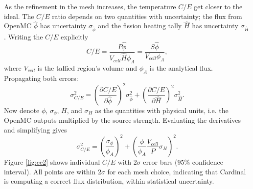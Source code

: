 \documentclass[letterpaper]{mc2023}
\begin{document}
As the refinement in the mesh increases, the temperature $C/E$ get closer to the ideal. The $C/E$ ratio depends on two quantities with uncertainty; the
flux from OpenMC $\hat{\phi}$ has uncertainty $\sigma_{\hat{\phi}}$ and the fission heating tally $\hat{H}$ has uncertainty $\sigma_{\hat{H}}$. Writing
the $C/E$ explicitly
\begin{equation}\label{eq:CE_formula}
    C/E =
    \frac{P\hat{\phi}}{V_{cell}\hat{H}\phi_{A}} = \frac{S\hat{\phi}}{V_{cell}\phi_{A}},
\end{equation}
where $V_{cell}$ is the tallied region's volume and $\phi_{A}$ is the analytical flux. Propagating both errors:
\begin{equation}\label{eq:sigma_ce_def}
    \sigma_{C/E}^2 =
    \left( \frac{\partial C/E}{\partial\hat{\phi}} \right)^2 \sigma_{\hat{\phi}}^2  +
     \left( \frac{\partial C/E}{\partial \hat{H}} \right)^2 \sigma_{\hat{H}}^2 .
\end{equation}
Now denote $\phi$, $\sigma_{\phi}$, $H$, and $\sigma_{H}$ as the quantities with physical units, i.e. the OpenMC outputs multiplied by the source strength.
Evaluating the derivatives and simplifying gives
\begin{equation}\label{eq:sigma_CE_physical_units}
    \sigma_{C/E}^2 =
    \left(\frac{\sigma_{\phi} }{\phi_{A}} \right)^2 +
     \left( \frac{\phi}{\phi_{A}}\frac{V_{cell}}{P}\sigma_{H} \right)^2.
\end{equation}
Figure \ref{fig:ce2} shows individual $C/E$ with $2\sigma$ error bars (95\% confidence interval). All points are within $2\sigma$ for each mesh choice, indicating that Cardinal is computing
a correct flux distribution, within statistical uncertainty.
\end{document}
